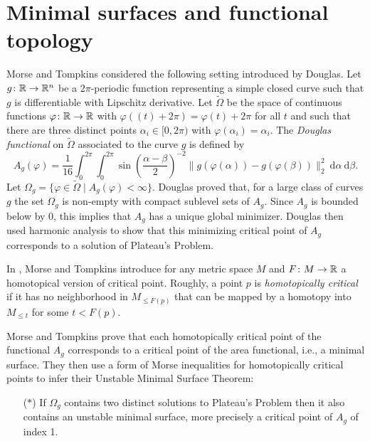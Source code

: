 
\section{Minimal surfaces and functional topology} \label{s:surfaces}

Morse and Tompkins considered the following setting introduced by Douglas.
Let $g \colon \mathbb{R} \to \mathbb{R}^n$ be a $2\pi$-periodic function representing a simple closed curve such that $g$ is differentiable with Lipschitz derivative.
Let $\widetilde{\Omega}$ be the space of continuous functions $\varphi \colon \mathbb{R} \to \mathbb{R}$ with $\varphi((t)+2\pi) = \varphi(t) + 2\pi$ for all $t$ and such that there are three distinct points $\alpha_i \in [0,2\pi)$ with $\varphi(\alpha_i)=\alpha_i$.
The \emph{Douglas functional} on $\widetilde \Omega$ associated to the curve $g$ is defined by
\begin{equation*}
A_g(\varphi)=\frac{1}{16}\int_0^{2\pi}\int_0^{2\pi}\sin\left(\frac{\alpha-\beta}{2}\right)^{-2} \! \lVert g(\varphi(\alpha))-g(\varphi(\beta)) \rVert_2^2 \ \mathrm{d}\alpha \ \mathrm{d}\beta.
\end{equation*}
Let $\Omega_g=\{\varphi\in\widetilde\Omega\mid A_g(\varphi)<\infty\}$.
Douglas proved that, for a large class of curves $g$ the set $\Omega_g$ is non-empty with compact sublevel sets of $A_g$.
Since $A_g$ is bounded below by $0$, this implies that $A_g$ has a unique global minimizer.
Douglas then used harmonic analysis to show that this minimizing critical point of $A_g$ corresponds to a solution of Plateau's Problem.

In \cite[p.445]{Morse.1939}, Morse and Tompkins introduce for any metric space $M$ and $F \colon M \to \mathbb{R}$ a homotopical version of critical point.
Roughly, a point $p$ is \textit{homotopically critical} if it has no neighborhood in $M_{\leq F(p)}$ that can be mapped by a homotopy into $M_{\leq t}$ for some $t<F(p)$.

Morse and Tompkins prove that each homotopically critical point of the functional $A_g$ corresponds to a critical point of the area functional, i.e., a minimal surface.
They then use a form of Morse inequalities for homotopically critical points to infer their Unstable Minimal Surface Theorem:
\begin{itemize}
    \item[($\ast$)] If $\Omega_g$ contains two distinct solutions to Plateau's Problem then it also contains an unstable minimal surface, more precisely a critical point of $A_g$ of index 1.
\end{itemize}


